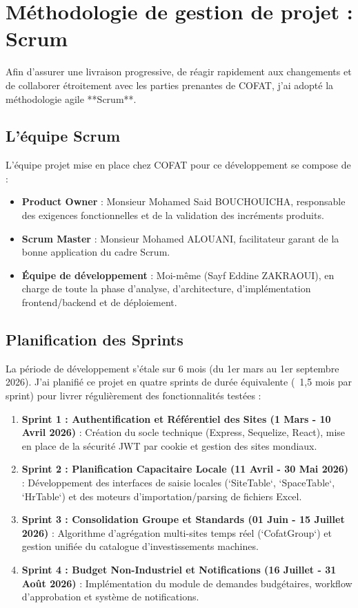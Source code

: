 \section{Méthodologie de gestion de projet : Scrum}

Afin d'assurer une livraison progressive, de réagir rapidement aux changements et de collaborer étroitement avec les parties prenantes de COFAT, j'ai adopté la méthodologie agile **Scrum**.

\subsection{L'équipe Scrum}

L'équipe projet mise en place chez COFAT pour ce développement se compose de :
\begin{itemize}[label=\textbullet]
    \item \textbf{Product Owner} : Monsieur Mohamed Said BOUCHOUICHA, responsable des exigences fonctionnelles et de la validation des incréments produits.
    \item \textbf{Scrum Master} : Monsieur Mohamed ALOUANI, facilitateur garant de la bonne application du cadre Scrum.
    \item \textbf{Équipe de développement} : Moi-même (Sayf Eddine ZAKRAOUI), en charge de toute la phase d'analyse, d'architecture, d'implémentation frontend/backend et de déploiement.
\end{itemize}

\subsection{Planification des Sprints}

La période de développement s'étale sur 6 mois (du 1er mars au 1er septembre 2026). J'ai planifié ce projet en quatre sprints de durée équivalente (~1,5 mois par sprint) pour livrer régulièrement des fonctionnalités testées :

\begin{enumerate}
    \item \textbf{Sprint 1 : Authentification et Référentiel des Sites (1 Mars - 10 Avril 2026)} : Création du socle technique (Express, Sequelize, React), mise en place de la sécurité JWT par cookie et gestion des sites mondiaux.
    \item \textbf{Sprint 2 : Planification Capacitaire Locale (11 Avril - 30 Mai 2026)} : Développement des interfaces de saisie locales (`SiteTable`, `SpaceTable`, `HrTable`) et des moteurs d'importation/parsing de fichiers Excel.
    \item \textbf{Sprint 3 : Consolidation Groupe et Standards (01 Juin - 15 Juillet 2026)} : Algorithme d'agrégation multi-sites temps réel (`CofatGroup`) et gestion unifiée du catalogue d'investissements machines.
    \item \textbf{Sprint 4 : Budget Non-Industriel et Notifications (16 Juillet - 31 Août 2026)} : Implémentation du module de demandes budgétaires, workflow d'approbation et système de notifications.
\end{enumerate}

